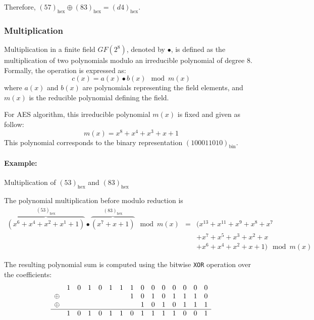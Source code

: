 Therefore, $(57)_{\text{hex}} \oplus (83)_{\text{hex}} = (d4)_{\text{hex}}$. 


\subsubsection{Multiplication}
\label{sec:multiplication}

Multiplication in a finite field $GF(2^8)$, denoted by $\bullet$, is defined as the multiplication of two polynomials modulo an irreducible polynomial of degree 8.
Formally, the operation is expressed as:
\begin{equation}
    c(x) = a(x) \bullet b(x) \mod m(x)
    \label{eq:mul}
\end{equation}
where $a(x)$ and $b(x)$ are polynomials representing the field elements, and $m(x)$ is the reducible polynomial defining the field.

For \gls{AES} algorithm, this irreducible polynomial $m(x)$ is fixed and given as follow:
\begin{equation}
    m(x) = x^8 + x^4 + x^3 + x + 1
\end{equation}
This polynomial corresponds to the binary representation $(100011010)_{\text{bin}}$.

\paragraph{Example:} Multiplication of $(53)_{\text{hex}}$ and $(83)_{\text{hex}}$

The polynomial multiplication before modulo reduction is
\[
\begin{array}{ccl}
    \overbrace{(x^6 + x^4 + x^2 + x^1 + 1)}^{(53)_{\text{hex}}} \bullet \overbrace{(x^7 + x + 1)}^{(83)_{\text{hex}}} \mod m(x) & = & (x^{13} + x^{11} + x^9 + x^8 + x^7\\
    && + x^7 + x^5 + x^3 + x^2 + x\\
    && + x^6 + x^4 + x^2 + x + 1 ) \mod m(x)
\end{array}
\]

The resulting polynomial sum is computed using the bitwise \texttt{XOR} operation over the coefficients:
\[
\begin{array}{ccccccccccccccc}
    &1&0&1&0&1&1&1&0&0&0&0&0&0&0\\
    \oplus &&&&&&&1&0&1&0&1&1&1&0\\
    \oplus &&&&&&&&1&0&1&0&1&1&1\\
    \hline
    &1&0&1&0&1&1&0&1&1&1&1&0&0&1
\end{array}
\]

